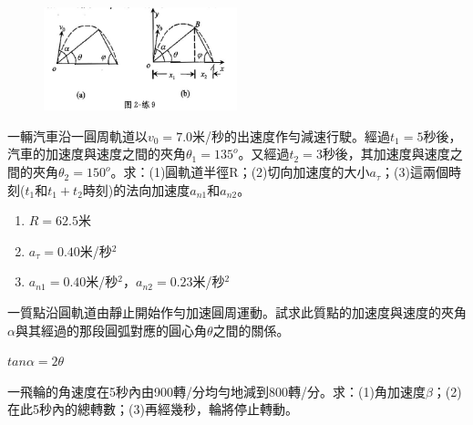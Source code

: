 \documentclass[cn,10pt,math=newtx,chinesefont=founder]{../elegantbook}
\begin{document}
\begin{solution}

\end{solution}


\begin{figure}[htbp]
\flushright
\includegraphics[width=0.5\textwidth]{image/2-9.jpeg}
\end{figure}

\newpage

\begin{example}
    一輛汽車沿一圓周軌道以$v_0=7.0$米/秒的出速度作勻減速行駛。經過$t_1=5$秒後，汽車的加速度與速度之間的夾角$\theta_1=135^o$。又經過$t_2=3$秒後，其加速度與速度之間的夾角$\theta_2=150^o$。求：(1)圓軌道半徑R；(2)切向加速度的大小$a_\tau$；(3)這兩個時刻($t_1$和$t_1+t_2$時刻)的法向加速度$a_{n1}$和$a_{n2}$。
    
    \rightline{[練2-10]}
\end{example}

\begin{solution}
\begin{enumerate}[label=(\arabic*)]
    \item $R=62.5$米
    \item $a_\tau=0.40$米/秒$^2$
    \item $a_{n1}=0.40$米/秒$^2$，$a_{n2}=0.23$米/秒$^2$
\end{enumerate}
\end{solution}



\newpage

\begin{example}
    一質點沿圓軌道由靜止開始作勻加速圓周運動。試求此質點的加速度與速度的夾角$\alpha$與其經過的那段圓弧對應的圓心角$\theta$之間的關係。
    
    \rightline{[練2-11]}
\end{example}

\begin{solution}
$tan\alpha=2\theta$
\end{solution}


\newpage

\begin{example}
    一飛輪的角速度在5秒內由900轉/分均勻地減到800轉/分。求：(1)角加速度$\beta$；(2)在此5秒內的總轉數；(3)再經幾秒，輪將停止轉動。
    
    \rightline{[練2-12]}
\end{example}
\end{document}
